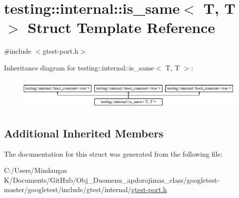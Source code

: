 \hypertarget{structtesting_1_1internal_1_1is__same_3_01_t_00_01_t_01_4}{}\section{testing\+::internal\+::is\+\_\+same$<$ T, T $>$ Struct Template Reference}
\label{structtesting_1_1internal_1_1is__same_3_01_t_00_01_t_01_4}


{\ttfamily \#include $<$gtest-\/port.\+h$>$}

Inheritance diagram for testing\+::internal\+::is\+\_\+same$<$ T, T $>$\+:\begin{figure}[H]
\begin{center}
\leavevmode
\includegraphics[height=1.595442cm]{d7/d68/structtesting_1_1internal_1_1is__same_3_01_t_00_01_t_01_4}
\end{center}
\end{figure}
\subsection*{Additional Inherited Members}


The documentation for this struct was generated from the following file\+:\begin{DoxyCompactItemize}
\item 
C\+:/\+Users/\+Mindaugas K/\+Documents/\+Git\+Hub/\+Obj\+\_\+\+Duomenu\+\_\+apdorojimas\+\_\+class/googletest-\/master/googletest/include/gtest/internal/\mbox{\hyperlink{googletest-master_2googletest_2include_2gtest_2internal_2gtest-port_8h}{gtest-\/port.\+h}}\end{DoxyCompactItemize}
